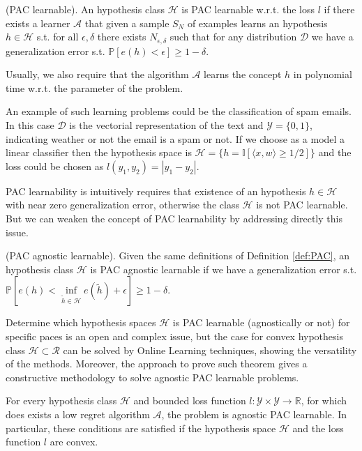 \begin{definition}(PAC learnable).\label{def:PAC}
    An hypothesis class $\mathcal H$ is PAC learnable w.r.t. the loss $l$ if there exists a learner $\mathcal A$ that given a sample $S_N$ of examples learns an hypothesis $h\in\mathcal H$ s.t. for all $\epsilon,\delta$ there exists $N_{\epsilon,\delta}$ such that for any distribution $\mathcal D$ we have a generalization error s.t. $\mathbb P\left[e(h)<\epsilon\right]\ge1-\delta$.
\end{definition}

Usually, we also require that the algorithm $\mathcal A$ learns the concept $h$ in polynomial time w.r.t. the parameter of the problem. 

An example of such learning problems could be the classification of spam emails. In this case $\mathcal D$ is the vectorial representation of the text and $\mathcal Y=\{0,1\}$, indicating weather or not the email is a spam or not. If we choose as a model a linear classifier then the hypothesis space is $\mathcal H=\{h = \mathbb I[\langle x,w\rangle \ge 1/2]\}$ and the loss could be chosen as $l(y_1,y_2)=|y_1-y_2|$.

PAC learnability is intuitively requires that existence of an hypothesis $h\in\mathcal H$ with near zero generalization error, otherwise the class $\mathcal H$ is not PAC learnable.
But we can weaken the concept of PAC learnability by addressing directly this issue.

\begin{definition}(PAC agnostic learnable).
    Given the same definitions of Definition \ref{def:PAC}, an hypothesis class $\mathcal H$ is PAC agnostic learnable if we have a generalization error s.t. $\mathbb P\left[e(h)<\inf\limits_{\tilde h\in\mathcal H}e(\tilde h)+\epsilon\right]\ge1-\delta.$
\end{definition}

Determine which hypothesis spaces $\mathcal H$ is PAC learnable (agnostically or not) for specific paces is an open and complex issue, but the case for convex hypothesis class $\mathcal H\subset\mathcal R$ can be solved by Online Learning techniques, showing the versatility of the methods. 
Moreover, the approach to prove such theorem gives a constructive methodology to solve agnostic PAC learnable problems.

\begin{theorem}
For every hypothesis class $\mathcal H$ and bounded loss function $l:\mathcal Y\times\mathcal Y\to \mathbb R$, for which does exists a low regret algorithm $\mathcal A$, the problem is agnostic PAC learnable. In particular, these conditions are satisfied if the hypothesis space $\mathcal H$ and the loss function $l$ are convex.
\end{theorem}

